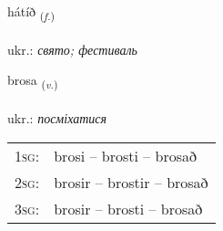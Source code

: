 \documentclass[frontgrid, backgrid]{flacards}\usepackage[]{graphicx}\usepackage[]{xcolor}
\begin{document}
\renewcommand{\flhead}{\vskip5pt \fboxsep=0pt {\small\bfseries\footnotesize Nafnorð | іменник}}
\renewcommand{\fcfoot}{\vskip5pt \fboxsep=0pt \hspace{2pt}{\small\bfseries\footnotesize 2K}}

\renewcommand{\blhead}{\vskip5pt {\small\bfseries\footnotesize Nafnorð | іменник }}
\renewcommand{\bcfoot}{\vskip5pt \hspace{2pt}{\small\bfseries\footnotesize 2K}}


{hátíð \small{\textsubscript{(\textit{f.})}} \\[1ex] %
\textphonetic{[hauːtʰið]} \\
ukr.: \emph{свято; фестиваль} \\  [2ex]
\renewcommand*{\arraystretch}{0.8}
}

\renewcommand{\flhead}{\vskip5pt \fboxsep=0pt {\small\bfseries\footnotesize Sagnorð | дієслово}}
\renewcommand{\fcfoot}{\vskip5pt \fboxsep=0pt \hspace{2pt}{\small\bfseries\footnotesize 2K}}

\renewcommand{\blhead}{\vskip5pt {\small\bfseries\footnotesize Sagnorð | дієслово }}
\renewcommand{\bcfoot}{\vskip5pt \hspace{2pt}{\small\bfseries\footnotesize 2K}}


{brosa \small{\textsubscript{(\textit{v.})}} \\[1ex] %
\textphonetic{[prɔːsa]} \\
ukr.: \emph{посміхатися} \\  [2ex]
\renewcommand*{\arraystretch}{0.8}
\begin{tabular}{p{1cm}l}
\textsc{1sg}: & brosi -- brosti -- brosað \\ 
\textsc{2sg}: & brosir -- brostir -- brosað \\ 
\textsc{3sg}: & brosir -- brosti -- brosað \\ 
\end{tabular}
}
\end{document}

